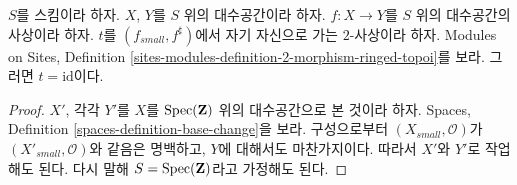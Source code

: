 \begin{lemma}
\label{lemma-2-morphism}
$S$를 스킴이라 하자.
$X$, $Y$를 $S$ 위의 대수공간이라 하자.
$f : X \to Y$를 $S$ 위의 대수공간의 사상이라 하자.
$t$를 $(f_{small}, f^\sharp)$에서 자기 자신으로 가는 $2$-사상이라 하자.
Modules on Sites, Definition
\ref{sites-modules-definition-2-morphism-ringed-topoi}를 보라.
그러면 $t = \text{id}$이다.
\end{lemma}

\begin{proof}
$X'$, 각각 $Y'$를 $X$를 $\mathop{\mathrm{Spec}}(\mathbf{Z})$ 위의 대수공간으로 본
것이라 하자. Spaces, Definition \ref{spaces-definition-base-change}을 보라.
구성으로부터 $(X_{small}, \mathcal{O})$가
$(X'_{small}, \mathcal{O})$와 같음은 명백하고, $Y$에 대해서도
마찬가지이다. 따라서 $X'$와 $Y'$로 작업해도 된다. 다시 말해
$S = \mathop{\mathrm{Spec}}(\mathbf{Z})$라고 가정해도 된다.


\end{proof}
